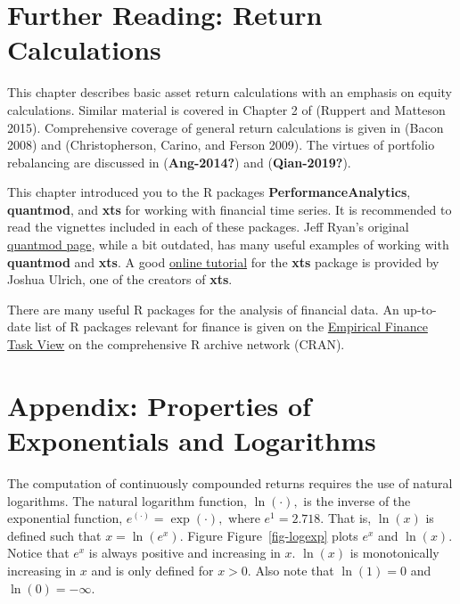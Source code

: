 \documentclass[
  letterpaper,
  DIV=11,
  numbers=noendperiod]{scrreprt}
\theoremstyle{definition}
\theoremstyle{definition}
\theoremstyle{remark}
\begin{document}
\hypertarget{further-reading-return-calculations}{%
\section{Further Reading: Return
Calculations}\label{further-reading-return-calculations}}

This chapter describes basic asset return calculations with an emphasis
on equity calculations. Similar material is covered in Chapter 2 of
(Ruppert and Matteson 2015). Comprehensive coverage of general return
calculations is given in (Bacon 2008) and (Christopherson, Carino, and
Ferson 2009). The virtues of portfolio rebalancing are discussed in
(\textbf{Ang-2014?}) and (\textbf{Qian-2019?}).

This chapter introduced you to the R packages
\textbf{PerformanceAnalytics}, \textbf{quantmod}, and \textbf{xts} for
working with financial time series. It is recommended to read the
vignettes included in each of these packages. Jeff Ryan's original
\href{http://www.quantmod.com/}{quantmod page}, while a bit outdated,
has many useful examples of working with \textbf{quantmod} and
\textbf{xts}. A good
\href{http://joshuaulrich.github.io/xts/index.html}{online tutorial} for
the \textbf{xts} package is provided by Joshua Ulrich, one of the
creators of \textbf{xts}.

There are many useful R packages for the analysis of financial data. An
up-to-date list of R packages relevant for finance is given on the
\href{https://cran.r-project.org/web/views/Finance.html}{Empirical
Finance Task View} on the comprehensive R archive network (CRAN).

\newpage{}

\hypertarget{appendix-properties-of-exponentials-and-logarithms}{%
\section{Appendix: Properties of Exponentials and
Logarithms}\label{appendix-properties-of-exponentials-and-logarithms}}

The computation of continuously compounded returns requires the use of
natural logarithms. The natural logarithm function, \(\ln(\cdot),\) is
the inverse of the exponential function, \(e^{(\cdot)}=\exp(\cdot),\)
where \(e^{1}=2.718.\) That is, \(\ln(x)\) is defined such that
\(x=\ln(e^{x}).\) Figure Figure~\ref{fig-logexp} plots \(e^{x}\) and
\(\ln(x)\). Notice that \(e^{x}\) is always positive and increasing in
\(x\). \(\ln(x)\) is monotonically increasing in \(x\) and is only
defined for \(x>0.\) Also note that \(\ln(1)=0\) and \(\ln(0)=-\infty.\)
\end{document}
